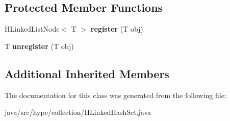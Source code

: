 \subsection*{Protected Member Functions}
\begin{DoxyCompactItemize}
\item 
\hypertarget{classhype_1_1collection_1_1_h_linked_hash_set_3_01_t_01_4_a3b665ec7179794bc46c592e23cc395d3}{H\-Linked\-List\-Node$<$ T $>$ {\bfseries register} (T obj)}\label{classhype_1_1collection_1_1_h_linked_hash_set_3_01_t_01_4_a3b665ec7179794bc46c592e23cc395d3}

\item 
\hypertarget{classhype_1_1collection_1_1_h_linked_hash_set_3_01_t_01_4_af592576c6f64717a767e5836e7cb88e5}{T {\bfseries unregister} (T obj)}\label{classhype_1_1collection_1_1_h_linked_hash_set_3_01_t_01_4_af592576c6f64717a767e5836e7cb88e5}

\end{DoxyCompactItemize}
\subsection*{Additional Inherited Members}


The documentation for this class was generated from the following file\-:\begin{DoxyCompactItemize}
\item 
java/src/hype/collection/H\-Linked\-Hash\-Set.\-java\end{DoxyCompactItemize}
